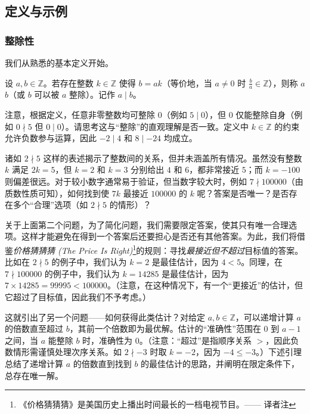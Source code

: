 
\subsection{定义与示例}

\subsubsection*{整除性}

我们从熟悉的基本定义开始。

\begin{definition}
    设 $a,b \in \mathbb{Z}$。若存在整数 $k \in \mathbb{Z}$ 使得 $b = ak$（等价地，当 $a \neq 0$ 时 $\frac{b}{a} \in \mathbb{Z}$），则称 $a$  $b$（或 $b$ 可以被 $a$ 整除）。记作 $a \mid b$。
\end{definition}

注意，根据定义，任意非零整数均可整除 $0$（例如 $5 \mid 0$），但 $0$ 仅能整除自身（例如 $0 \nmid 5$ 但 $0 \mid 0$）。请思考这与``整除''的直观理解是否一致。定义中 $k \in \mathbb{Z}$ 的约束允许负数参与运算，因此 $-2 \mid 4$ 和 $8 \mid -24$ 均成立。

诸如 $2 \nmid 5$ 这样的表述揭示了整数间的关系，但并未涵盖所有情况。虽然没有整数 $k$ 满足 $2k=5$，但 $k=2$ 和 $k=3$ 分别给出 $4$ 和 $6$，都非常接近 $5$；而 $k = -100$ 则偏差很远。对于较小数字通常易于验证，但当数字较大时，例如 $7 \nmid 100000$（由质数性质可知），如何找到使 $7k$ 最接近 $100000$ 的 $k$ 呢？答案是否唯一？是否存在多个``合理''选项（如 $2 \nmid 5$ 的情形）？

关于上面第二个问题，为了简化问题，我们需要限定答案，使其只有唯一合理选项。这样才能避免在得到一个答案后还要担心是否还有其他答案。为此，我们将借鉴\emph{价格猜猜猜 (The Price Is Right)}\footnote{《价格猜猜猜》是美国历史上播出时间最长的一档电视节目。—— 译者注}的规则：寻找\emph{最接近但不超过}目标值的答案。比如在 $2 \nmid 5$ 的例子中，我们认为 $k = 2$ 是最佳估计，因为 $4 < 5$。同理，在 $7 \nmid 100000$ 的例子中，我们认为 $k = 14285$ 是最佳估计，因为 $7 \times 14285 = 99995 < 100000$。（注意，在这种情况下，有一个``更接近''的估计，但它超过了目标值，因此我们不予考虑。）

这就引出了另一个问题——如何获得此类估计？对给定 $a,b \in \mathbb{Z}$，可以递增计算 $a$ 的倍数直至超过 $b$，其前一个倍数即为最优解。估计的``准确性''范围在 $0$ 到 $a - 1$ 之间，当 $a$ 能整除 $b$ 时，准确性为 $0$。（注意：``超过''是指顺序关系 $>$，因此负数情形需谨慎处理次序关系。如 $2 \nmid -3$ 时取 $k=-2$，因为 $-4 \le -3$。）下述引理总结了递增计算 $a$ 的倍数直到找到 $b$ 的最佳估计的思路，并阐明在限定条件下，总存在唯一解。

